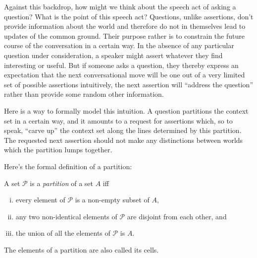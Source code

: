 Against this backdrop, how might we think about the speech act of asking a
question? What is the point of this speech act? %
%
Questions, unlike assertions, don't provide information about the world and
therefore do not in themselves lead to updates of the common ground. Their
purpose rather is to constrain the future course of the conversation in a
certain way. In the absence of any particular question under consideration, a
speaker might assert whatever they find interesting or useful. But if someone
asks a question, they thereby express an expectation that the next
conversational move will be one out of a very limited set of possible assertions
\dash intuitively, the next assertion will ``address the question'' rather than
provide some random other information.

Here is a way to formally model this intuition. A question partitions the
context set in a certain way, and it amounts to a request for assertions which,
so to speak, ``carve up'' the context set along the lines determined by this
partition. The requested next assertion should not make any distinctions between
worlds which the partition lumps together.

Here's the formal definition of a partition:

\begin{definition}[Partition]\label{def:partition}
  A set $\mathcal{P}$ is a \emph{partition} of a set $A$ iff

  \begin{enumerate}[(i)]
    \item every element of $\mathcal{P}$ is a non-empty subset of $A$,
    \item any two non-identical elements of $\mathcal{P}$ are disjoint from each
          other, and
    \item the union of all the elements of $\mathcal{P}$ is $A$.
  \end{enumerate}

  The elements of a partition are also called its cells.
\end{definition}

